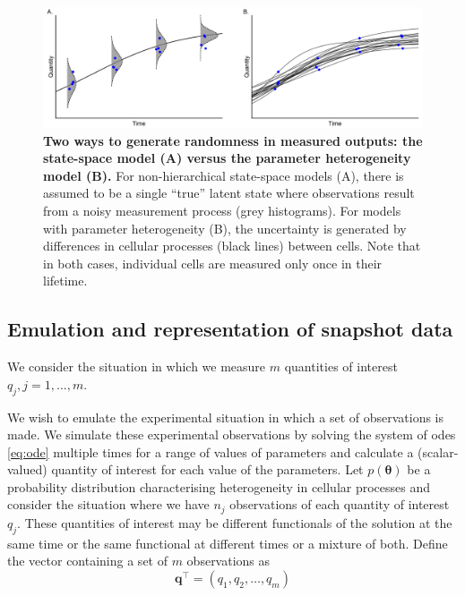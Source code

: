 \begin{figure}[H]
	\centerline{\includegraphics[width=\textwidth]{../figures/data_generation.pdf}}
	\caption{\textbf{Two ways to generate randomness in measured outputs: the state-space model (A) versus the parameter heterogeneity model (B).} For non-hierarchical state-space models (A), there is assumed to be a single ``true'' latent state where observations result from a noisy measurement process (grey histograms). For models with parameter heterogeneity (B), the uncertainty is generated by differences in cellular processes (black lines) between cells. Note that in both cases, individual cells are measured only once in their lifetime.}
	\label{fig:data_generation}
\end{figure}

\subsection{Emulation and representation of snapshot data}

We consider the situation in which we measure $m$ quantities of interest $q_j, j=1, \dots, m$.

We wish to emulate the experimental situation in which a set of observations is made. We simulate these experimental observations by solving the system of odes \eqref{eq:ode} multiple times for a range of values of parameters and calculate a (scalar-valued) quantity of interest for each value of the parameters.  Let $p(\boldsymbol{\theta})$ be a probability distribution characterising heterogeneity in cellular processes and consider the situation where we have $n_j$ observations of each quantity of interest $q_j$. These quantities of interest may be different functionals of the solution at the same time or the same functional at different times or a mixture of both. Define the vector containing a set of $m$ observations as
\begin{equation}
\boldsymbol{q}^\top = \left( q_1, q_2, \dots, q_m \right)
\end{equation}

